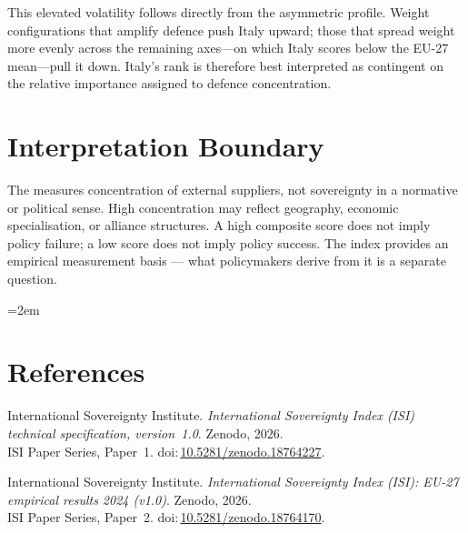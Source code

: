 \documentclass[12pt,a4paper]{article}
\begin{document}
This elevated volatility follows directly from the asymmetric profile.  Weight configurations that amplify defence push Italy upward; those that spread weight more evenly across the remaining axes---on which Italy scores below the EU-27 mean---pull it down.  Italy's rank is therefore best interpreted as contingent on the relative importance assigned to defence concentration.


\section{Interpretation Boundary}
\label{sec:interpretation}

The \ISI measures concentration of external suppliers, not sovereignty in a normative or political sense.  High concentration may reflect geography, economic specialisation, or alliance structures.  A high composite score does not imply policy failure; a low score does not imply policy success.  The index provides an empirical measurement basis --- what policymakers derive from it is a separate question.


\clearpage
\vspace*{1.5cm}

\begingroup\emergencystretch=2em
\section*{References}

\begin{enumerate}[label={[\arabic*]},leftmargin=2em,itemsep=6pt]
\item International Sovereignty Institute.
  \textit{International Sovereignty Index (ISI) technical specification, version~1.0}.
  Zenodo, 2026.\\ISI Paper Series, Paper~1.
  doi:\,\href{https://doi.org/10.5281/zenodo.18764227}{10.5281/zenodo.18764227}.

\item International Sovereignty Institute.
  \textit{International Sovereignty Index (ISI): EU-27 empirical results 2024 (v1.0)}.
  Zenodo, 2026.\\ISI Paper Series, Paper~2.
  doi:\,\href{https://doi.org/10.5281/zenodo.18764170}{10.5281/zenodo.18764170}.
\end{enumerate}
\endgroup
\end{document}
